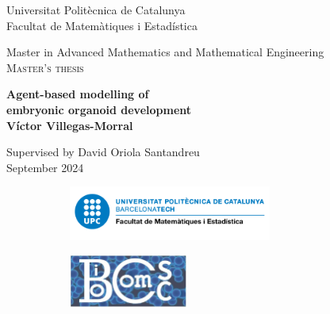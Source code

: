 \thispagestyle{empty}

\begin{titlepage}
    \begin{center}
        \Large Universitat Politècnica de Catalunya\\[0.2em]
        \LARGE Facultat de Matemàtiques i Estadística
    \end{center}
    \vspace{3cm}
    \begin{center}
        \large Master in Advanced Mathematics and Mathematical Engineering\\[0.2em]
        \LARGE\scshape Master's thesis
    \end{center}
    \vspace{1cm}
    \begin{center}
        {\color{RoyalBlue}\Huge\bf Agent-based modelling of \\[0.5em]
        embryonic organoid development}\\[1.5em]
        {\LARGE\bf Víctor Villegas-Morral}
    \end{center}
    \vspace{3cm}
    \begin{center}
        \Large Supervised by David Oriola Santandreu \\[0.5em]
        \large September 2024
    \end{center}
    \begin{figure}[b]
        \centering
        \begin{subfigure}{0.62\textwidth}
            \centering
            \includegraphics[height=4.8em]{figures/cover-upcfme.png}
        \end{subfigure}
        \hfill
        \begin{subfigure}{0.36\textwidth}
            \centering
            \includegraphics[height=4.8em]{figures/cover-biocomsc.jpeg}
        \end{subfigure}
    \end{figure}
    \restoregeometry
\end{titlepage}